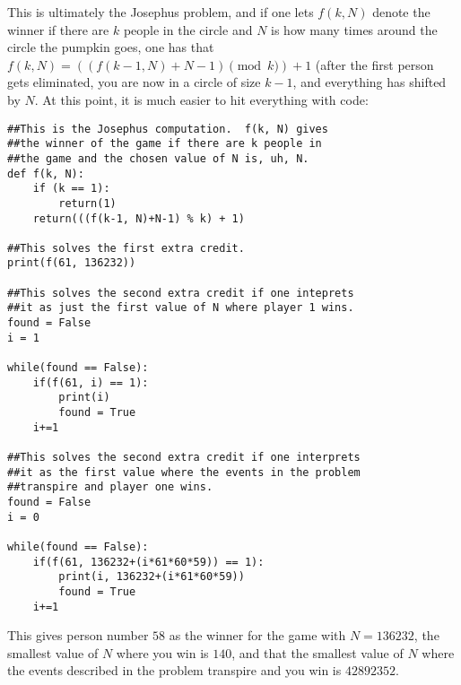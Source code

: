 \documentclass[11pt]{article}
\theoremstyle{definition}
\begin{document}
This is ultimately the Josephus problem, and if one lets $f(k, N)$ denote the winner if there are $k$ people in the circle and $N$ is how many times around the circle the pumpkin goes, one has that $f(k, N) = ((f(k-1, N)+N-1) \pmod{k}) + 1$ (after the first person gets eliminated, you are now in a circle of size $k-1$, and everything has shifted by $N$.  At this point, it is much easier to hit everything with code:
\begin{verbatim}
##This is the Josephus computation.  f(k, N) gives
##the winner of the game if there are k people in
##the game and the chosen value of N is, uh, N. 
def f(k, N):
    if (k == 1):
        return(1)
    return(((f(k-1, N)+N-1) % k) + 1)

##This solves the first extra credit.
print(f(61, 136232))

##This solves the second extra credit if one inteprets
##it as just the first value of N where player 1 wins.
found = False
i = 1

while(found == False):
    if(f(61, i) == 1):
        print(i)
        found = True
    i+=1

##This solves the second extra credit if one interprets
##it as the first value where the events in the problem
##transpire and player one wins.
found = False
i = 0

while(found == False):
    if(f(61, 136232+(i*61*60*59)) == 1):
        print(i, 136232+(i*61*60*59))
        found = True
    i+=1
\end{verbatim}
This gives person number $58$ as the winner for the game with $N = 136232$, the smallest value of $N$ where you win is $140$, and that the smallest value of $N$ where the events described in the problem transpire and you win is $42892352$.
\end{document}
